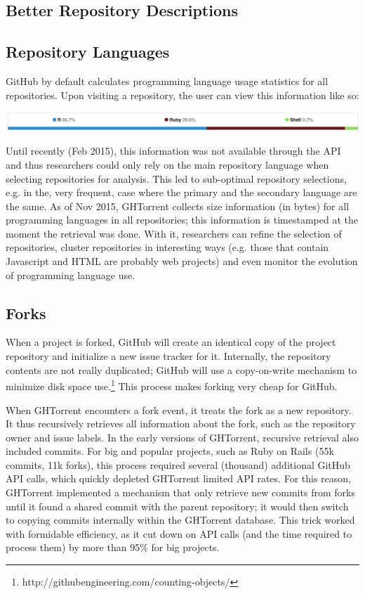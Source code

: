 \documentclass{sig-alternate}
\begin{document}
\subsection{Better Repository Descriptions}


\subsection{Repository Languages}
GitHub by default calculates programming language usage statistics for all
repositories. Upon visiting a repository, the user can view this information
like so:

\noindent\includegraphics[scale=0.243]{languages}

Until recently (Feb 2015), this information was not available through the API
and thus researchers could only rely on the main repository language when
selecting repositories for analysis. This led to sub-optimal repository
selections, e.g. in the, very frequent, case where the primary and the secondary
language are the same. As of Nov 2015, GHTorrent collects size information (in
bytes) for all programming languages in all repositories; this information is
timestamped at the moment the retrieval was done. With it, researchers can
refine the selection of repositories, cluster repositories in interesting ways
(e.g. those that contain Javascript and HTML are probably web projects) and even
monitor the evolution of programming language use.

\subsection{Forks}

When a project is forked, GitHub will create an identical copy of the project
repository and initialize a new issue tracker for it. Internally, the repository
contents are not really duplicated; GitHub will use a copy-on-write
mechanism to minimize disk space use.\footnote{http://githubengineering.com/counting-objects/} This process makes forking very cheap for GitHub.

When GHTorrent encounters a fork event, it treats the fork as a new repository.
It thus recursively retrieves all information about the fork, such as the
repository owner and issue labels. In the early versions of
GHTorrent, recursive retrieval also included commits. For big and popular
projects, such as Ruby on Rails (55k commits, 11k forks),
this process required several (thousand) additional GitHub API calls, which
quickly depleted GHTorrent limited API rates. For this reason, GHTorrent implemented a mechanism that only retrieve new commits from forks until
it found a shared commit with the parent repository; it would then switch
to copying commits internally within the GHTorrent database. This trick worked
with formidable efficiency, as it cut down on API calls (and the time required
to process them) by more than 95\% for big projects.
\end{document}
